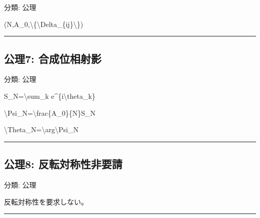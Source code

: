 \documentclass[
  a4paper]{ltjsarticle}
\newenvironment{Shaded}{}{}
\newcommand{\NormalTok}[1]{#1}
\begin{document}
分類: 公理

\begin{Shaded}
\begin{Highlighting}[]
\NormalTok{(N,A\_0,\textbackslash{}\{\textbackslash{}Delta\_\{ij\}\textbackslash{}\})}
\end{Highlighting}
\end{Shaded}

\begin{center}\rule{0.5\linewidth}{0.5pt}\end{center}

\subsection{公理7:
合成位相射影}\label{ux516cux74067-ux5408ux6210ux4f4dux76f8ux5c04ux5f71}

分類: 公理

\begin{Shaded}
\begin{Highlighting}[]
\NormalTok{S\_N=\textbackslash{}sum\_k e\^{}\{i\textbackslash{}theta\_k\}}
\end{Highlighting}
\end{Shaded}

\begin{Shaded}
\begin{Highlighting}[]
\NormalTok{\textbackslash{}Psi\_N=\textbackslash{}frac\{A\_0\}\{N\}S\_N}
\end{Highlighting}
\end{Shaded}

\begin{Shaded}
\begin{Highlighting}[]
\NormalTok{\textbackslash{}Theta\_N=\textbackslash{}arg\textbackslash{}Psi\_N}
\end{Highlighting}
\end{Shaded}

\begin{center}\rule{0.5\linewidth}{0.5pt}\end{center}

\subsection{公理8:
反転対称性非要請}\label{ux516cux74068-ux53cdux8ee2ux5bfeux79f0ux6027ux975eux8981ux8acb}

分類: 公理

反転対称性を要求しない。

\begin{center}\rule{0.5\linewidth}{0.5pt}\end{center}
\end{document}

